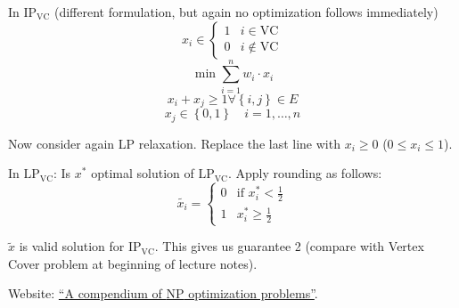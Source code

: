 \documentclass[a4paper]{article}
\newcommand{\cls}[1]{\rm{#1}}
\newcommand{\set}[1]{\left\{#1\right\}}
\begin{document}
In $\text{IP}_{\text{VC}}$ (different formulation, but again no optimization follows immediately)
\[
  x_i \in \begin{cases}
    1 & i \in \text{VC} \\
    0 & i \notin \text{VC}
  \end{cases}
\] \[
  \min \sum_{i=1}^n w_i \cdot x_i
\] \[
  x_i + x_j \geq 1 \forall \set{i,j} \in E
\] \[
  x_j \in \set{0,1} \quad i = 1, \ldots, n
\]

Now consider again LP relaxation. Replace the last line with
$x_i \geq 0$ ($0 \leq x_i \leq 1$).

In $\text{LP}_{\text{VC}}$:
Is $x^*$ optimal solution of $\text{LP}_{\text{VC}}$.
Apply rounding as follows:
\[
  \tilde{x_i} = \begin{cases}
    0 & \text{if } x_i^* < \frac12 \\
    1 & x_i^* \geq \frac12
  \end{cases}
\]

$\tilde{x}$ is valid solution for $\text{IP}_{\text{VC}}$.
This gives us guarantee 2 (compare with Vertex Cover problem at
beginning of lecture notes).

Website: \href{http://www.nada.kth.se/~viggo/wwwcompendium/}{``A compendium of \cls{NP} optimization problems''}.
\end{document}

